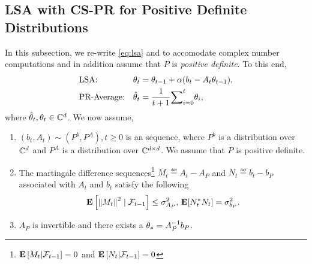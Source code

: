 \subsection{LSA with CS-PR for Positive Definite Distributions}
In this subsection, we re-write \eqref{eq:lsa} and  to accomodate complex number computations and in addition assume that $P$ is \emph{positive definite}. To this end,
\begin{subequations}\label{eq:lsacmplx}
\begin{align}
\label{conststepapp}&\text{LSA:} &\theta_t&=\theta_{t-1}+\alpha(b_t-A_t\theta_{t-1}),\\
\label{iteravgapp}&\text{PR-Average:} &\hat{\theta}_t&=\frac{1}{t+1}{\sum}_{i=0}^{t}\theta_i,
\end{align}
\end{subequations}
where $\hat{\theta}_t, \theta_t \in \mathbb{C}^{d}$. We now assume,
\begin{assumption}\label{assmp:lsacmplx}
\begin{enumerate}[leftmargin=*, before = \leavevmode\vspace{-\baselineskip}]
\item \label{distapp} $(b_t, A_t)\sim (P^b,P^A), t\geq 0$ is an \iid sequence, where $P^b$ is a distribution over $\mathbb{C}^d$ and $P^A$ is a distribution over $\mathbb{C}^{d \times d}$. We assume that $P$ is positive definite.
\item \label{matvarapp} The martingale difference sequences\footnote{$\mathbf{E}\left[M_t|\mathcal{F}_{t-1}\right]=0$ and $\mathbf{E}\left[N_t|\mathcal{F}_{t-1}\right]=0$} $M_t\eqdef A_t-A_{P}$ and $N_t\eqdef b_t-b_{P}$ associated with $A_t$ and $b_t$ satisfy the following
\begin{align*}\mathbf{E}\left[ \left\| M_t\right\|^2\mid\mathcal{F}_{t-1}\right]\leq \sigma^2_{A_P}, \, \mathbf{E}[N_t^* N_t]=\sigma^2_{b_P}.\end{align*}
\item $A_P$ is invertible and there exists a $\theta_*=A^{-1}_Pb_P$.
\end{enumerate}
\end{assumption}





